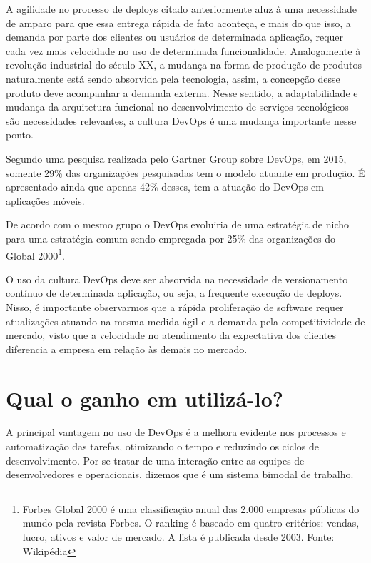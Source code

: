 A agilidade no processo de deploys citado anteriormente aluz à uma necessidade de amparo para que essa entrega rápida de fato aconteça, e mais do que isso, a demanda por parte dos clientes ou usuários de determinada aplicação, requer cada vez mais velocidade no uso de determinada funcionalidade. Analogamente à revolução industrial do século XX, a mudança na forma de produção de produtos naturalmente está sendo absorvida pela tecnologia, assim, a concepção desse produto deve acompanhar a demanda externa. Nesse sentido, a adaptabilidade e mudança da arquitetura funcional no desenvolvimento de serviços tecnológicos são necessidades relevantes, a cultura DevOps é uma mudança importante nesse ponto.

Segundo uma pesquisa realizada pelo Gartner Group sobre DevOps, em 2015, somente 29\% das organizações pesquisadas tem o modelo atuante em produção. É apresentado ainda que apenas 42\% desses, tem a atuação do DevOps em aplicações móveis.

De acordo com o mesmo grupo o DevOps evoluiria de uma estratégia de nicho para uma estratégia comum sendo empregada por 25\% das organizações do Global 2000\footnote{Forbes Global 2000 é uma classificação anual das 2.000 empresas públicas do mundo pela revista Forbes. O ranking é baseado em quatro critérios: vendas, lucro, ativos e valor de mercado. A lista é publicada desde 2003. Fonte: Wikipédia}.

O uso da cultura DevOps deve ser absorvida na necessidade de versionamento contínuo de determinada aplicação, ou seja, a frequente execução de deploys. Nisso, é importante observarmos que a rápida proliferação de software requer atualizações atuando na mesma medida ágil e a demanda pela competitividade de mercado, visto que a velocidade no atendimento da expectativa dos clientes diferencia a empresa em relação às demais no mercado.



\section{Qual o ganho em utilizá-lo?}
A principal vantagem no uso de DevOps é a melhora evidente nos processos e automatização das tarefas, otimizando o tempo e reduzindo os ciclos de desenvolvimento. Por se tratar de uma interação entre as equipes de desenvolvedores e operacionais, dizemos que é um sistema bimodal de trabalho.

